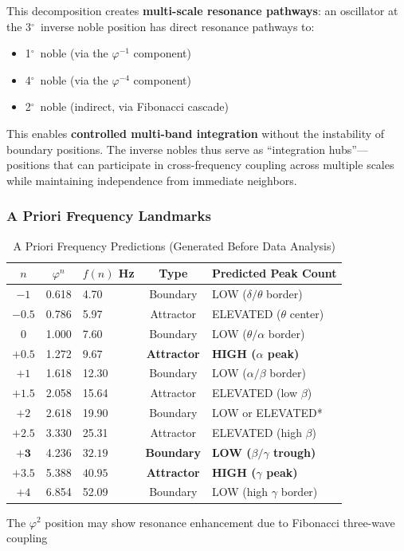 \documentclass[11pt,a4paper]{article}
\newcommand{\degree}{$^\circ$}  %
\newcommand{\phisym}{\varphi}
\begin{document}
This decomposition creates \textbf{multi-scale resonance pathways}: an oscillator at the 3\degree\ inverse noble position has direct resonance pathways to:
\begin{itemize}
    \item 1\degree\ noble (via the $\phisym^{-1}$ component)
    \item 4\degree\ noble (via the $\phisym^{-4}$ component)
    \item 2\degree\ noble (indirect, via Fibonacci cascade)
\end{itemize}

This enables \textbf{controlled multi-band integration} without the instability of boundary positions. The inverse nobles thus serve as ``integration hubs''---positions that can participate in cross-frequency coupling across multiple scales while maintaining independence from immediate neighbors.

\subsubsection{A Priori Frequency Landmarks}

\begin{table}[H]
\centering
\caption{A Priori Frequency Predictions (Generated Before Data Analysis)}
\label{tab:predictions}
\begin{tabular}{@{}cclcl@{}}
\toprule
$n$ & $\phisym^n$ & $f(n)$ Hz & Type & Predicted Peak Count \\
\midrule
$-1$ & 0.618 & 4.70 & Boundary & LOW ($\delta/\theta$ border) \\
$-0.5$ & 0.786 & 5.97 & Attractor & ELEVATED ($\theta$ center) \\
$0$ & 1.000 & 7.60 & Boundary & LOW ($\theta/\alpha$ border) \\
$\mathbf{+0.5}$ & 1.272 & $\mathbf{9.67}$ & \textbf{Attractor} & \textbf{HIGH ($\alpha$ peak)} \\
$+1$ & 1.618 & 12.30 & Boundary & LOW ($\alpha/\beta$ border) \\
$+1.5$ & 2.058 & 15.64 & Attractor & ELEVATED (low $\beta$) \\
$+2$ & 2.618 & 19.90 & Boundary & LOW or ELEVATED* \\
$+2.5$ & 3.330 & 25.31 & Attractor & ELEVATED (high $\beta$) \\
$\mathbf{+3}$ & 4.236 & $\mathbf{32.19}$ & \textbf{Boundary} & \textbf{LOW ($\beta/\gamma$ trough)} \\
$\mathbf{+3.5}$ & 5.388 & $\mathbf{40.95}$ & \textbf{Attractor} & \textbf{HIGH ($\gamma$ peak)} \\
$+4$ & 6.854 & 52.09 & Boundary & LOW (high $\gamma$ border) \\
\bottomrule
\end{tabular}
\begin{tablenotes}
\small
\item *The $\phisym^2$ position may show resonance enhancement due to Fibonacci three-wave coupling
\end{tablenotes}
\end{table}
\end{document}
